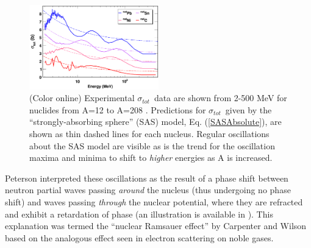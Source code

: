 \documentclass[twocolumn,secnumarabic,amssymb, nobibnotes, aps, prl,
superscriptaddress, nobalancelastpage]{revtex4}
\newcommand{\tot}{\ensuremath{\sigma_{tot}}}
\begin{document}
\begin{figure}
    \includegraphics[width=0.5\textwidth]{figures/ExampleTCS.png}
    \caption{
        (Color online) Experimental \tot\ data are shown from 2-500
        MeV for nuclides from A=12 to A=208
        \cite{Finlay1993, Schwartz1974, Poenitz1983, Abfalterer2000, Abfalterer2001}.
        Predictions for \tot\ given by the ``strongly-absorbing sphere'' (SAS)
        model, Eq. (\ref{SASAbsolute}), are shown as thin dashed lines for each nucleus.
        Regular oscillations about the SAS model are visible
        as is the trend for the oscillation
        maxima and minima to shift to \textit{higher} energies as A is increased.
    }
    \label{SASphereVsExperiment}
\end{figure}
Peterson \cite{Peterson1962} interpreted these oscillations as the 
result of a phase shift between neutron partial waves passing \textit{around} the 
nucleus (thus undergoing no phase shift) and waves passing
\textit{through} the nuclear potential, where they are refracted and exhibit a 
retardation of phase (an illustration is available in \cite{Satchler1980}).
This explanation was termed the 
``nuclear Ramsauer effect'' by Carpenter and Wilson \cite{Carpenter1959} based on 
the analogous effect seen in electron scattering on noble gases.
\end{document}
